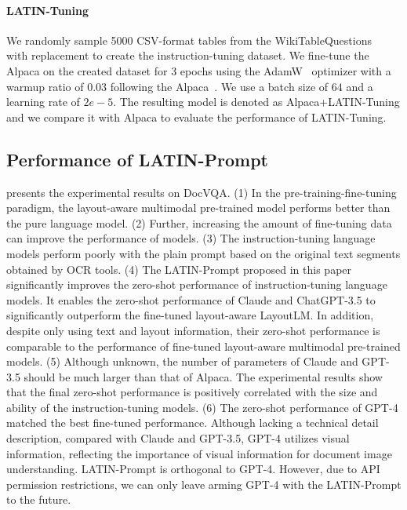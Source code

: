 \documentclass[letterpaper]{article} \usepackage{aaai24_preprint}  \usepackage{times}  \usepackage{helvet}  \usepackage{courier}  \usepackage[hyphens]{url}  \usepackage{graphicx} \urlstyle{rm} \def\UrlFont{\rm}  \usepackage{natbib}  \usepackage{caption} \frenchspacing  \setlength{\pdfpagewidth}{8.5in} \setlength{\pdfpageheight}{11in} \usepackage{algorithm}
\begin{document}
\paragraph{LATIN-Tuning} We randomly sample 5000 CSV-format tables from the WikiTableQuestions~\cite{pasupatWikiTableQuestions2015} with replacement to create the instruction-tuning dataset.
We fine-tune the Alpaca on the created dataset for 3 epochs using the AdamW~\cite{loshchilovAdamW2018} optimizer with a warmup ratio of 0.03 following the Alpaca~\cite{StanfordAlpacaInstructionfollowing2023}.
We use a batch size of $64$ and a learning rate of $2e-5$.
The resulting model is denoted as Alpaca+LATIN-Tuning and we compare it with Alpaca to evaluate the performance of LATIN-Tuning.

\subsection{Performance of LATIN-Prompt}
 presents the experimental results on DocVQA.
(1) In the pre-training-fine-tuning paradigm, the layout-aware multimodal pre-trained model performs better than the pure language model.
(2) Further, increasing the amount of fine-tuning data can improve the performance of models.
(3) The instruction-tuning language models perform poorly with the plain prompt based on the original text segments obtained by OCR tools.
(4) The LATIN-Prompt proposed in this paper significantly improves the zero-shot performance of instruction-tuning language models.
It enables the zero-shot performance of Claude and ChatGPT-3.5 to significantly outperform the fine-tuned layout-aware LayoutLM.
In addition, despite only using text and layout information, their zero-shot performance is comparable to the performance of fine-tuned layout-aware multimodal pre-trained models.
(5) Although unknown, the number of parameters of Claude and GPT-3.5 should be much larger than that of Alpaca.
The experimental results show that the final zero-shot performance is positively correlated with the size and ability of the instruction-tuning models.
(6) The zero-shot performance of GPT-4 matched the best fine-tuned performance.
Although lacking a technical detail description, compared with Claude and GPT-3.5, GPT-4 utilizes visual information, reflecting the importance of visual information for document image understanding.
LATIN-Prompt is orthogonal to GPT-4.
However, due to API permission restrictions, we can only leave arming GPT-4 with the LATIN-Prompt to the future.
\end{document}
